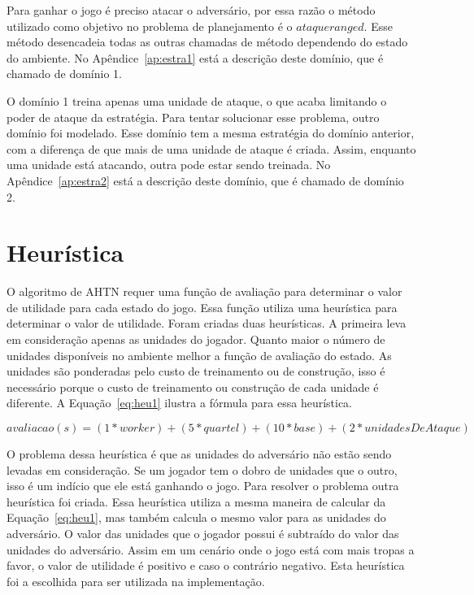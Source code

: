 Para ganhar o jogo é preciso atacar o adversário, por essa razão o método utilizado como objetivo no problema de planejamento é o $ataqueranged$.
Esse método desencadeia todas as outras chamadas de método dependendo do estado do ambiente.
No Apêndice~\ref{ap:estra1} está a descrição deste domínio, que é chamado de domínio 1.

O domínio 1 treina apenas uma unidade de ataque, o que acaba limitando o poder de ataque da estratégia.
Para tentar solucionar esse problema, outro domínio foi modelado.
Esse domínio tem a mesma estratégia do domínio anterior, com a diferença de que mais de uma unidade de ataque é criada.
Assim, enquanto uma unidade está atacando, outra pode estar sendo treinada.
No Apêndice~\ref{ap:estra2} está a descrição deste domínio, que é chamado de domínio 2.


\section{Heurística}

O algoritmo de AHTN requer uma função de avaliação para determinar o valor de utilidade para cada estado do jogo. Essa função utiliza uma heurística para determinar o valor de utilidade.
Foram criadas duas heurísticas.
A primeira leva em consideração apenas as unidades do jogador.
Quanto maior o número de unidades disponíveis no ambiente melhor a função de avaliação do estado.
As unidades são ponderadas pelo custo de treinamento ou de construção, isso é necessário porque o custo de treinamento ou construção de cada unidade é diferente.
A Equação~\ref{eq:heu1} ilustra a fórmula para essa heurística.

\begin{equation}
\label{eq:heu1}	
avaliacao(s) =  (1*worker) + (5 * quartel) + (10 * base) + (2 * unidadesDeAtaque)
\end{equation}

O problema dessa heurística é que as unidades do adversário não estão sendo levadas em consideração.
Se um jogador tem o dobro de unidades que o outro, isso é um indício que ele está ganhando o jogo.
Para resolver o problema outra heurística foi criada.
Essa heurística utiliza a mesma maneira de calcular da Equação~\ref{eq:heu1}, mas também calcula o mesmo valor para as unidades do adversário. 
O valor das unidades que o jogador possui é subtraído do valor das unidades do adversário. 
Assim em um cenário onde o jogo está com mais tropas a favor, o valor de utilidade é positivo e caso o contrário negativo.
Esta heurística foi a escolhida para ser utilizada na implementação.

